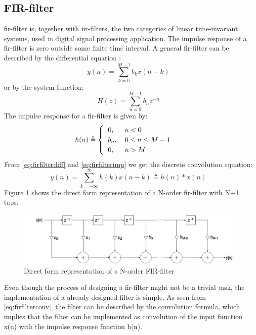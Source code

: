 \subsection{FIR-filter}
\gls{fir}-filter is, together with \gls{iir}-filters, the two categories of linear time-invariant systems, used in digital signal processing application. The impulse response of a \gls{fir}-filter is zero outside some finite time interval.
A general \gls{fir}-filter can be described by the differential equation \cite{proakis2007digital}:
\begin{equation}
    y(n)=\sum\limits_{k=0}^{M-1} b_kx(n-k)
    \label{eq:firfilterdiff}
\end{equation}
or by the system function:
\begin{equation}
    H(z)=\sum\limits_{n=0}^{M-1} b_nz^{-n}
    \label{eq:firfiltersys}
\end{equation}
The impulse response for a \gls{fir}-filter is given by:
\begin{equation}
    h(n)\triangleq
    \begin{cases}
    \begin{tabular}{ll}
      $0,$ & $n < 0$  \\
      $b_n,$ & $0 \leq n \leq M-1$  \\
      $0,$ & $n > M$   
      \end{tabular}
    \end{cases}
    \label{eq:firfilterimp}
\end{equation}
From \cref{eq:firfilterdiff} and \cref{eq:firfilterimp} we get the discrete convolution equation:
\begin{equation}
    y(n)=\sum\limits_{k=-\infty}^{\infty} h(k)x(n-k) \triangleq h(n) \ast x(n)
    \label{eq:firfilterconv}
\end{equation}
\noindent
Figure \ref{fig:firfilter} shows the direct form representation of a N-order \gls{fir}-filter with N+1 taps. 
\begin{figure}[hbpt]
\centering
\includegraphics[width=\textwidth]{../figs/FIRFilter.png}
\caption{\label{fig:firfilter}Direct form representation of a N-order FIR-filter}
\end{figure}
Even though the process of designing a \gls{fir}-filter might not be a trivial task, the implementation of a already designed filter is simple. As seen from \cref{eq:firfilterconv}, the filter can be described by the convolution formula, which implies that the filter can be implemented as convolution of the input function x(n) with the impulse response function h(n).

